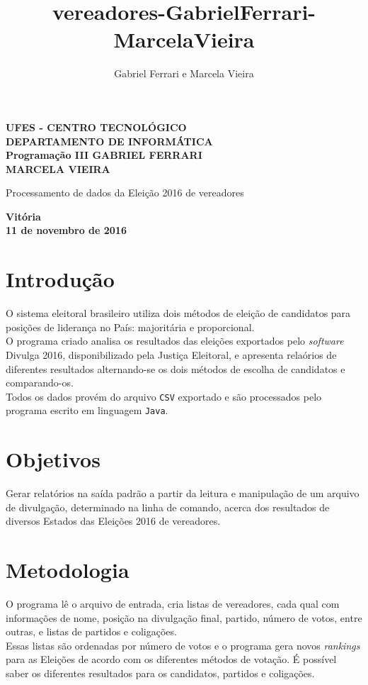 \documentclass[12pt,a4paper]{article}
\author{Gabriel Ferrari e Marcela Vieira}
\title{vereadores-GabrielFerrari-MarcelaVieira}
\begin{document}
\begin{center}\textbf{
\large UFES - CENTRO TECNOLÓGICO\\ DEPARTAMENTO DE INFORMÁTICA \\
\normalsize Programação III
\vfill
GABRIEL FERRARI\\
MARCELA VIEIRA}
\vfill
\begin{center}
Processamento de dados da Eleição 2016 de vereadores
\end{center}
\vfill
\textbf{
\large Vitória\\
11 de novembro de 2016}
\pagestyle{empty}
\end{center}
\newpage

\section{Introdução}
O sistema  eleitoral brasileiro utiliza dois métodos de eleição de candidatos para posições de liderança no País: majoritária e proporcional.\\
O programa criado analisa os resultados das eleições exportados pelo \textit{software} Divulga 2016, disponibilizado pela Justiça Eleitoral, e apresenta relaórios de diferentes resultados
alternando-se os dois métodos de escolha de candidatos e comparando-os.\\
Todos os dados provém do arquivo \texttt{CSV} exportado e são processados pelo programa escrito em linguagem \texttt{Java}.

\section{Objetivos}
Gerar relatórios na saída padrão a partir da leitura e manipulação de um arquivo de divulgação, determinado na linha de comando, acerca dos resultados de diversos Estados das Eleições 2016 de vereadores.\\

\section{Metodologia}
O programa lê o arquivo de entrada, cria listas de vereadores, cada qual com informações de nome, posição na divulgação final, partido, número de votos, entre outras, e listas de partidos e coligações.\\
Essas listas são ordenadas por número de votos e o programa gera novos \textit{rankings} para as Eleições de acordo com os diferentes métodos de votação. É possível saber os diferentes resultados para os candidatos, partidos e coligações.
\end{document}
